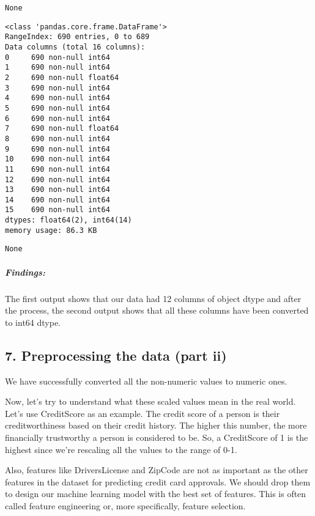 \documentclass[11pt]{article}
\begin{document}
    
    \begin{verbatim}
None
    \end{verbatim}

    
    \begin{Verbatim}[commandchars=\\\{\}]
<class 'pandas.core.frame.DataFrame'>
RangeIndex: 690 entries, 0 to 689
Data columns (total 16 columns):
0     690 non-null int64
1     690 non-null int64
2     690 non-null float64
3     690 non-null int64
4     690 non-null int64
5     690 non-null int64
6     690 non-null int64
7     690 non-null float64
8     690 non-null int64
9     690 non-null int64
10    690 non-null int64
11    690 non-null int64
12    690 non-null int64
13    690 non-null int64
14    690 non-null int64
15    690 non-null int64
dtypes: float64(2), int64(14)
memory usage: 86.3 KB

    \end{Verbatim}

    
    \begin{verbatim}
None
    \end{verbatim}

    
    \hypertarget{findings}{%
\subparagraph{Findings:}\label{findings}}

The first output shows that our data had 12 columns of object dtype and
after the process, the second output shows that all these columns have
been converted to int64 dtype.

    \hypertarget{preprocessing-the-data-part-ii}{%
\subsection{7. Preprocessing the data (part
ii)}\label{preprocessing-the-data-part-ii}}

We have successfully converted all the non-numeric values to numeric
ones.

Now, let's try to understand what these scaled values mean in the real
world. Let's use CreditScore as an example. The credit score of a person
is their creditworthiness based on their credit history. The higher this
number, the more financially trustworthy a person is considered to be.
So, a CreditScore of 1 is the highest since we're rescaling all the
values to the range of 0-1.

Also, features like DriversLicense and ZipCode are not as important as
the other features in the dataset for predicting credit card approvals.
We should drop them to design our machine learning model with the best
set of features. This is often called feature engineering or, more
specifically, feature selection.
\end{document}
